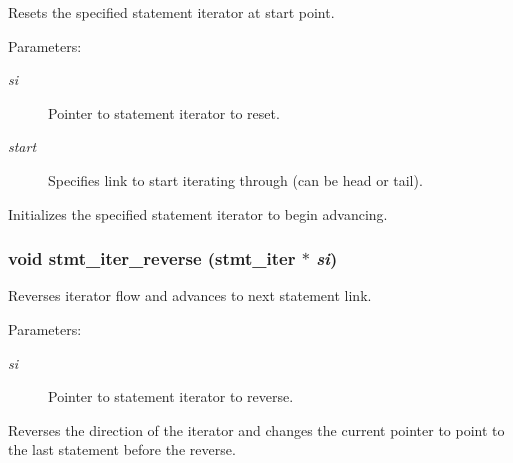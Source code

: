 Resets the specified statement iterator at start point.

\begin{Desc}
\item[Parameters: ]\par
\begin{description}
\item[{\em 
si}]Pointer to statement iterator to reset. \item[{\em 
start}]Specifies link to start iterating through (can be head or tail).\end{description}
\end{Desc}
Initializes the specified statement iterator to begin advancing. 
\subsubsection{\setlength{\rightskip}{0pt plus 5cm}void stmt\_\-iter\_\-reverse ({\bf stmt\_\-iter} $\ast$ {\em si})}\label{iter_8h_a2}


Reverses iterator flow and advances to next statement link.

\begin{Desc}
\item[Parameters: ]\par
\begin{description}
\item[{\em 
si}]Pointer to statement iterator to reverse.\end{description}
\end{Desc}
Reverses the direction of the iterator and changes the current pointer to point to the last statement before the reverse. 